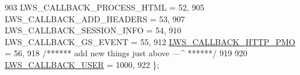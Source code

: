 \begin{DoxyCode}
903         LWS\_CALLBACK\_PROCESS\_HTML                               = 52,
905         LWS\_CALLBACK\_ADD\_HEADERS                                = 53,
907         LWS\_CALLBACK\_SESSION\_INFO                               = 54,
910         LWS\_CALLBACK\_GS\_EVENT                                   = 55,
912         \hyperlink{group__usercb_ggad62860e19975ba4c4af401c3cdb6abf7aa5cc921b7697743017a533822a3d556a}{LWS\_CALLBACK\_HTTP\_PMO}                                      = 56,
918         \textcolor{comment}{/****** add new things just above ---^ ******/}
919 
920         \hyperlink{group__usercb_ggad62860e19975ba4c4af401c3cdb6abf7a982579753e70e59a9ea13ce628ac891a}{LWS\_CALLBACK\_USER} = 1000,
922 \};
\end{DoxyCode}
